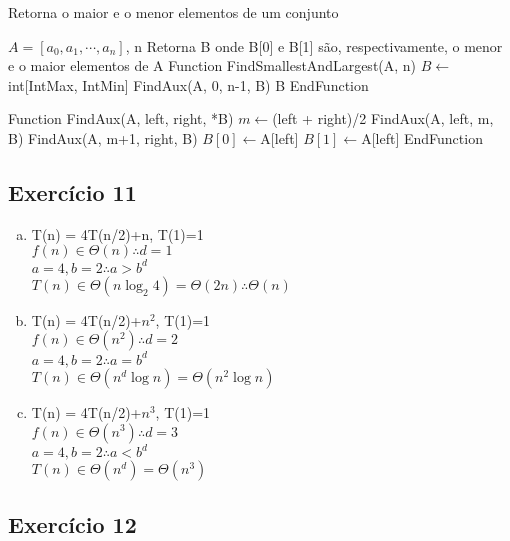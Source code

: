 \begin{algorithm}
  \caption{Retorna o maior e o menor elementos de um conjunto}
  \begin{algorithmic}
    \REQUIRE $A=[a_{0}, a_{1}, \cdots, a_{n}]$, n
    \ENSURE Retorna B onde B[0] e B[1] são, respectivamente, o menor e o maior elementos de A
    \STATE Function FindSmallestAndLargest(A, n)
      \STATE $B \leftarrow $int[IntMax, IntMin]
      \STATE FindAux(A, 0, n-1, B)
      \RETURN B
    \STATE EndFunction
    
    \STATE Function FindAux(A, left, right, *B)
        \STATE $m \leftarrow $(left + right)/2
        \STATE FindAux(A, left, m, B)
        \STATE FindAux(A, m+1, right, B)
      \ELSE
          \STATE $B[0] \leftarrow $A[left]
        \ENDIF
          \STATE $B[1] \leftarrow $A[left]
        \ENDIF
      \ENDIF
    \STATE EndFunction
  \end{algorithmic}
\end{algorithm}



\subsection{Exercício 11}\label{sec:exer11}

\begin{enumerate}[a)]
  \item T(n) = 4T(n/2)+n, T(1)=1 \\
  $f(n) \in \Theta(n) \therefore d=1$ \\
  $a = 4, b = 2 \therefore a>b^{d}$ \\
  $T(n) \in \Theta(n\log_{2}4) = \Theta(2n) \therefore \Theta(n)$
  \item T(n) = 4T(n/2)+$n^{2}$, T(1)=1 \\
  $f(n) \in \Theta(n^{2}) \therefore d=2$ \\
  $a = 4, b = 2 \therefore a=b^{d}$ \\
  $T(n) \in \Theta(n^{d} \log{}n) = \Theta(n^{2} \log{}n)$
  \item T(n) = 4T(n/2)+$n^{3}$, T(1)=1 \\
  $f(n) \in \Theta(n^{3}) \therefore d=3$ \\
  $a = 4, b = 2 \therefore a<b^{d}$ \\
  $T(n) \in \Theta(n^{d}) = \Theta(n^{3})$
\end{enumerate}

\subsection{Exercício 12}\label{sec:exer12}

